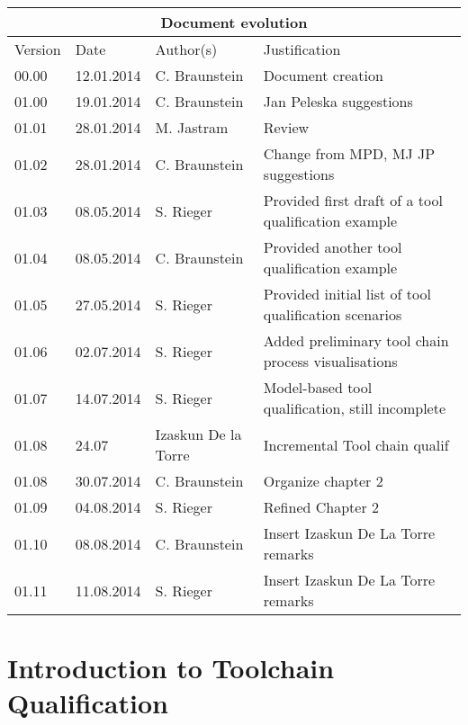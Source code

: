 \documentclass{template/openetcs_report}
\begin{document}
\begin{tabular}{|p{2.2cm}|p{2cm}|p{3cm}|p{5cm}|}
\hline
\multicolumn{4}{|c|}{Document evolution} \\
\hline
Version &  Date & Author(s) & Justification  \\
\hline  
00.00 & 12.01.2014 & C. Braunstein  &  Document creation  \\
01.00 & 19.01.2014 & C. Braunstein  &  Jan Peleska suggestions \\
01.01 & 28.01.2014 & M. Jastram  &  Review \\
01.02 & 28.01.2014 &  C. Braunstein &  Change from MPD, MJ JP suggestions \\
01.03 & 08.05.2014 &  S. Rieger &  Provided first draft of a tool qualification example \\
01.04 & 08.05.2014 &  C. Braunstein  &  Provided  another  tool qualification example \\
01.05 & 27.05.2014 &  S. Rieger &  Provided initial list of tool qualification scenarios\\
01.06 & 02.07.2014 &  S. Rieger &  Added preliminary tool chain process visualisations\\
01.07 & 14.07.2014 &  S. Rieger &  Model-based tool qualification,
still incomplete\\
01.08 & 24.07 & Izaskun De la Torre & Incremental Tool chain qualif \\
01.08 & 30.07.2014 & C. Braunstein & Organize chapter 2 \\
01.09 & 04.08.2014 & S. Rieger & Refined Chapter 2 \\
01.10 & 08.08.2014 & C. Braunstein & Insert Izaskun De La Torre
remarks\\
01.11 & 11.08.2014 & S. Rieger & Insert Izaskun De La Torre remarks\\
\hline  
\end{tabular}
\newpage


\mainmatter







\chapter{Introduction to Toolchain Qualification}
\label{chap:introduction-and-sota}

\end{document}
